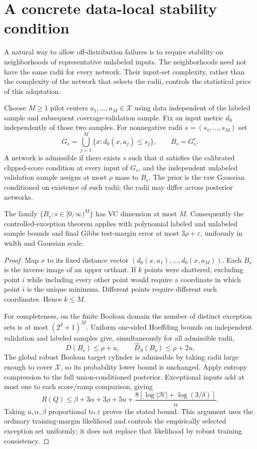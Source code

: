 \section{A concrete data-local stability condition}
\label{sec:local-geometry-condition}

A natural way to allow off-distribution failures is to require stability on
neighborhoods of representative unlabeled inputs. The neighborhoods need
not have the same radii for every network. Their input-set complexity,
rather than the complexity of the network that selects the radii, controls
the statistical price of this adaptation.

Choose $M\ge1$ pilot centers $a_1,\ldots,a_M\in\mathcal X$ using data
independent of the labeled sample and subsequent coverage-validation
sample. Fix an input metric $d_0$ independently of those two samples. For
nonnegative radii $s=(s_1,\ldots,s_M)$ set
\[
 G_s=\bigcup_{j=1}^M\{x:d_0(x,a_j)\le s_j\},\qquad B_s=G_s^c.
\]
A network is admissible if there exists $s$ such that it satisfies the
calibrated clipped-score condition at every input of $G_s$, and the
independent unlabeled validation sample assigns at most $\rho$ mass to
$B_s$. The prior is the raw Gaussian conditioned on existence of such
radii; the radii may differ across posterior networks.

\begin{proposition}
The family $\{B_s:s\in[0,\infty)^M\}$ has VC dimension at most $M$.
Consequently the controlled-exception theorem applies with polynomial
labeled and unlabeled sample bounds and final Gibbs test-margin error
at most $3\rho+\varepsilon$, uniformly in width and Gaussian scale.
\end{proposition}
\begin{proof}
Map $x$ to its fixed distance vector
$(d_0(x,a_1),\ldots,d_0(x,a_M))$. Each $B_s$ is the inverse image of an
upper orthant. If $k$ points were shattered, excluding point $i$ while
including every other point would require a coordinate in which point
$i$ is the unique minimum. Different points require different such
coordinates. Hence $k\le M$.

For completeness, on the finite Boolean domain the number of distinct
exception sets is at most $(2^d+1)^M$. Uniform one-sided Hoeffding bounds
on independent validation and labeled samples give, simultaneously for
all admissible radii,
\[
 D(B_s)\le\rho+u,\qquad \widehat D_S(B_s)\le\rho+2u.
\]
The global robust Boolean target cylinder is admissible by taking radii
large enough to cover $\mathcal X$, so its probability lower bound is
unchanged. Apply entropy compression to the full union-conditioned
posterior. Exceptional inputs add at most one to each score/ramp
comparison, giving
\[
 R(Q)\le\beta+3\alpha+3\rho+5u+
       \frac{8[\log|\mathcal H|+\log(3/\delta)]}{n}.
\]
Taking $u,\alpha,\beta$ proportional to $\varepsilon$ proves the stated
bound. This argument uses the ordinary training-margin likelihood and
controls the empirically selected exception set uniformly; it does not
replace that likelihood by robust training consistency.
\end{proof}

